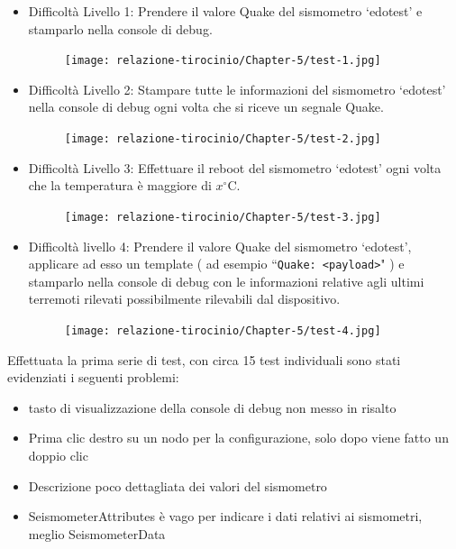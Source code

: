 \documentclass[a4paper,10pt]{memoir}
\begin{document}
\begin{itemize}
    \item Difficoltà Livello 1: Prendere il valore Quake del sismometro ‘edotest’ e stamparlo nella console di debug.
    
    \begin{figure}[ht]
        \centering
        \texttt{[image: relazione-tirocinio/Chapter-5/test-1.jpg]}
        \label{fig:test1}
    \end{figure}
    
    \item Difficoltà Livello 2: Stampare tutte le informazioni del sismometro ‘edotest’ nella console di debug ogni volta che si riceve un segnale Quake.
    \clearpage
    \begin{figure}[hbt]
        \centering
        \texttt{[image: relazione-tirocinio/Chapter-5/test-2.jpg]}
        \label{fig:test1}
    \end{figure}
    \item Difficoltà Livello 3: Effettuare il reboot del sismometro ‘edotest’ ogni volta che la temperatura è maggiore di $x^{\circ}$C.
    \begin{figure}[hbt]
        \centering
        \texttt{[image: relazione-tirocinio/Chapter-5/test-3.jpg]}
        \label{fig:test1}
    \end{figure}
    
    \item Difficoltà livello 4: Prendere il valore Quake del sismometro ‘edotest’, applicare ad esso un template ( ad esempio ``\texttt{Quake: <payload>}" ) e stamparlo nella console di debug con le informazioni relative agli ultimi terremoti rilevati possibilmente rilevabili dal dispositivo.
    
    \begin{figure}[ht]
        \centering
        \texttt{[image: relazione-tirocinio/Chapter-5/test-4.jpg]}
        \label{fig:test1}
    \end{figure}
    
\end{itemize}

Effettuata la prima serie di test, con circa 15 test individuali sono stati evidenziati i seguenti problemi:

\begin{itemize}
    \item tasto di visualizzazione della console di debug non messo in risalto
    \item Prima clic destro su un nodo per la configurazione, solo dopo viene fatto un doppio clic
    \item Descrizione poco dettagliata dei valori del sismometro
    \item SeismometerAttributes è vago per indicare i dati relativi ai sismometri, meglio SeismometerData
\end{itemize}
\end{document}
